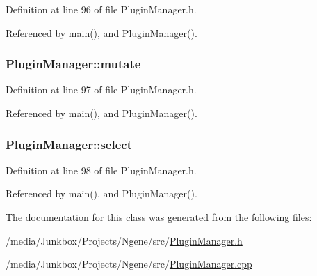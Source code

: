 Definition at line 96 of file PluginManager.h.

Referenced by main(), and PluginManager().\hypertarget{classPluginManager_d64faacd5d3222e068cd3a6632e75d7e}{
\subsubsection{ {\bf PluginManager::mutate}}}
\label{classPluginManager_d64faacd5d3222e068cd3a6632e75d7e}




Definition at line 97 of file PluginManager.h.

Referenced by main(), and PluginManager().\hypertarget{classPluginManager_01e6b62a96bea7b38b5ab83513037e6c}{
\subsubsection{ {\bf PluginManager::select}}}
\label{classPluginManager_01e6b62a96bea7b38b5ab83513037e6c}




Definition at line 98 of file PluginManager.h.

Referenced by main(), and PluginManager().

The documentation for this class was generated from the following files:\begin{CompactItemize}
\item 
/media/Junkbox/Projects/Ngene/src/\hyperlink{PluginManager_8h}{PluginManager.h}\item 
/media/Junkbox/Projects/Ngene/src/\hyperlink{PluginManager_8cpp}{PluginManager.cpp}\end{CompactItemize}
